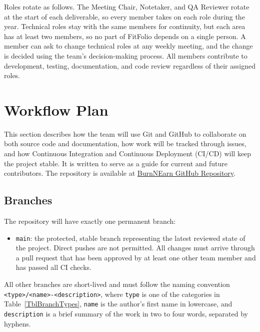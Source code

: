 \documentclass{article}
\begin{document}
Roles rotate as follows. The Meeting Chair, Notetaker, and QA Reviewer rotate at the start of each deliverable, so every member takes on each role during the year. Technical roles stay with the same members for continuity, but each area has at least two members, so no part of FitFolio depends on a single person. A member can ask to change technical roles at any weekly meeting, and the change is decided using the team's decision-making process. All members contribute to development, testing, documentation, and code review regardless of their assigned roles.
    
\section{Workflow Plan} \label{SecWorkflow}


This section describes how the team will use Git and GitHub to collaborate on both source code and documentation, how work will be tracked through issues, and how Continuous Integration and Continuous Deployment (CI/CD) will keep the project stable. 
It is written to serve as a guide for current and future contributors. The repository is available at \href{https://github.com/davislenover/BurnNEarn}{BurnNEarn GitHub Repository}.

\subsection{Branches}

The repository will have exactly one permanent branch:

\begin{itemize}
  \item \texttt{main}: the protected, stable branch representing the latest reviewed state of the project. Direct pushes are not permitted. 
  All changes must arrive through a pull request that has been approved by at least one other team member and has passed all CI checks.
\end{itemize}

All other branches are short-lived and must follow the naming convention \texttt{<type>/<name>-<description>}, where \texttt{type} is one of the categories in Table~\ref{TblBranchTypes}, \texttt{name} is the author's first name in lowercase, and \texttt{description} is a brief summary of the work in two to four words, separated by hyphens.
\end{document}
